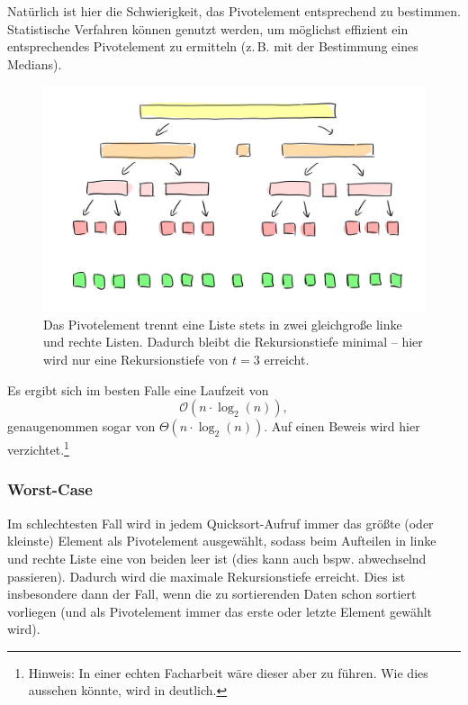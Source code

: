 \documentclass[11pt, a4paper, oneside, openright]{article}
\newcommand \zB{z.\,B.\xspace }
\begin{document}
Natürlich ist hier die Schwierigkeit, das Pivotelement entsprechend zu bestimmen. Statistische Verfahren können genutzt werden, um möglichst effizient ein entsprechendes Pivotelement zu ermitteln (\zB mit der Bestimmung eines Medians).

\begin{figure}[H]
    \centering
    \includegraphics[width=12cm]{bilder/qs_bestcase.jpg}
    \caption[Darstellung der Rekursion im Best-Case.]{Das Pivotelement trennt eine Liste stets in zwei gleichgroße linke und rechte Listen. Dadurch bleibt die Rekursionstiefe minimal -- hier wird nur eine Rekursionstiefe von $t = 3$ erreicht.}
    \label{fig:darstellungQSbestcase}
\end{figure}

Es ergibt sich im besten Falle eine Laufzeit von 
$$\mathcal{O}\left(n \cdot \log_2{(n)}\right),$$
genaugenommen sogar von $\Theta\left(n \cdot \log_2{(n)}\right)$. Auf einen Beweis wird hier verzichtet.\footnote{Hinweis: In einer echten Facharbeit wäre dieser aber zu führen. Wie dies aussehen könnte, wird in \cite{khanqslaufzeit} deutlich.}  





\subsubsection{Worst-Case}
Im schlechtesten Fall wird in jedem Quicksort-Aufruf immer das größte (oder kleinste) Element als Pivotelement ausgewählt, sodass beim Aufteilen in linke und rechte Liste eine von beiden leer ist (dies kann auch bspw. abwechselnd passieren). Dadurch wird die maximale Rekursionstiefe erreicht. Dies ist insbesondere dann der Fall, wenn die zu sortierenden Daten schon sortiert vorliegen (und als Pivotelement immer das erste oder letzte Element gewählt wird).
\end{document}
